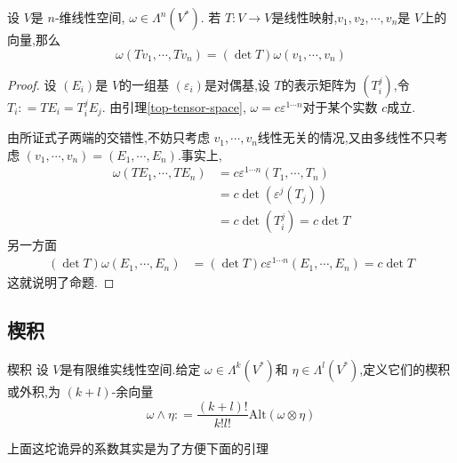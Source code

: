 \documentclass[../../几何与拓扑.tex]{subfiles}
\begin{document}
\begin{proposition}
    设 $ V $是 $ n $-维线性空间, $ \omega\in  \Lambda ^{n}\left( V^{*} \right)  $.
    若 $ T:V\to V $是线性映射,$ v_1,v_2,\cdots,v_n $是 $ V $上的向量,那么 $$
     \omega \left( Tv_1,\cdots ,Tv_{n} \right) = \left( \det T \right) \omega \left( v_1,\cdots ,v_{n} \right)   
    $$      
\end{proposition}

\begin{proof}
    设 $ \left( E_{i} \right)  $是 $ V $的一组基 $ \left(  \varepsilon _{i} \right)  $是对偶基,设 $ T $的表示矩阵为 $ \left( T_{i}^{j} \right)  $,令 $ T_{i}: = TE_{i}= T_{i}^{j}E_{j} $.
    由引理\ref{top-tensor-space}, $ \omega= c   \varepsilon ^{1\cdots n} $对于某个实数 $ c $成立.
    
    由所证式子两端的交错性,不妨只考虑 $ v_1,\cdots ,v_{n} $线性无关的情况,又由多线性不只考虑 $ \left( v_1,\cdots ,v_{n} \right)=\left( E_1,\cdots ,E _{n} \right)   $.事实上, $$
    \begin{aligned}
     \omega \left( TE_1,\cdots ,TE_{n} \right) & = c  \varepsilon ^{1\cdots n}\left( T_1,\cdots ,T_{n} \right) \\ 
      & =c \det \left(  \varepsilon ^{j}\left(  T_{j}\right)  \right) \\ 
       & = c \det \left( T_{i}^{j} \right)=c\det T 
    \end{aligned}
    $$另一方面 $$
    \begin{aligned}
    \left( \det T \right)  \omega \left( E_1,\cdots ,E_{n} \right)&  = \left( \det T \right)c \varepsilon ^{1\cdots n}\left( E_1,\cdots ,E_{n} \right)= c\det T     
    \end{aligned}
    $$ 这就说明了命题.
\end{proof} 

\subsection{楔积}

\begin{definition}{楔积}
    设 $ V $是有限维实线性空间.给定 $  \omega \in  \Lambda ^{k}\left( V^{*} \right)  $和 $ \eta \in   \Lambda ^{l}\left( V^{*} \right)  $,定义它们的楔积或外积,为 $ \left( k+ l \right)  $-余向量 $$
     \omega \wedge \eta: = \frac{\left( k+ l \right)!  }{k!l! } \mathrm{Alt}\left(  \omega \otimes \eta \right)  
    $$    
\end{definition}

上面这坨诡异的系数其实是为了方便下面的引理
\end{document}
